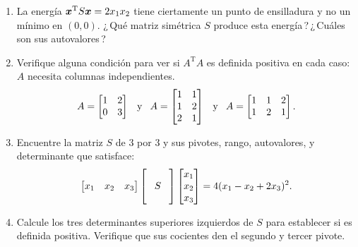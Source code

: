 \documentclass[12pt,a4paper]{article}
\newcommand{\bi}[1]{\hbox{\boldmath$#1$}}
\newcommand\1{\mbox{\,\vrule height-0.8pt depth1.0pt width2pc\,}}
\newcommand\2{\mbox{\,\vrule height-0.8pt depth1.0pt width1pc\,}}
\DeclareRobustCommand\transp{^{\mathrm{T}}}
\newcommand\og{\quad\hbox{y}\quad}
\begin{document}
\begin{enumerate}
\item La energía $\bi{x}\transp S\bi{x}=2x_1x_2$ tiene ciertamente un punto de ensilladura y no un mínimo en $(0,0)$. ¿\,Qué matriz simétrica $S$ produce esta energía\,?\,¿\,Cuáles son sus autovalores\,?

\item Verifique alguna condición para ver si $A\transp A$ es definida positiva en cada caso: $A$ necesita columnas independientes.
%
\[
A=\begin{bmatrix} 1&2\\ 0&3\end{bmatrix}\og
A=\begin{bmatrix} 1&1\\ 1&2\\ 2&1\end{bmatrix} \og
A=\begin{bmatrix} 1&1&2\\ 1&2&1\end{bmatrix}.
\]
\item Encuentre la matriz $S$ de $3$ por $3$ y sus pivotes, rango,
  autovalores, y determinante que satisface:
%
\[\begin{bmatrix} x_1 & x_2 & x_3\end{bmatrix}
     \begin{bmatrix}
       \vphantom{x_1}\\ \quad S\quad\vphantom{_1}\\
       \vphantom{x_1}\end{bmatrix}
       \begin{bmatrix} x_1\\
              x_2\\ x_3\end{bmatrix}
                =4(x_1-x_2+2x_3)^2.\]
 \item Calcule los tres determinantes superiores izquierdos de $S$ para establecer si es definida positiva. Verifique que sus cocientes den el segundo y tercer pivote.

\end{enumerate}
\end{document}
